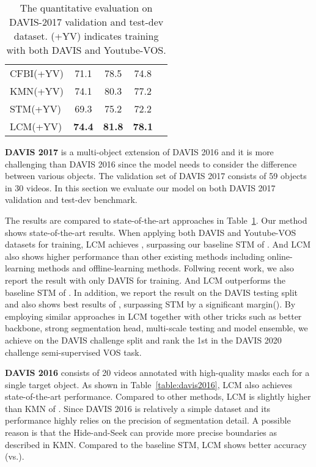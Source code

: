 \documentclass[final]{cvpr}
\begin{document}
\begin{table}
\begin{center}
\begin{tabular}{lcccc}
CFBI\cite{cfbi}(+YV)  & 71.1 &  78.5 &  74.8 \\
KMN\cite{KMN}(+YV)     &  74.1 & 80.3 & 77.2 \\


\hline
STM\cite{STM}(+YV)  &  69.3  &  75.2 & 72.2  \\
LCM(+YV)      & \textbf{74.4} &  \textbf{81.8} &  \textbf{78.1} \\
\hline
\end{tabular}
\end{center} 	\caption{The quantitative evaluation on DAVIS-2017 validation and test-dev dataset. (+YV) indicates training with both DAVIS and Youtube-VOS.  }
	\label{table:davis2017}
\end{table}


\textbf{DAVIS 2017}\cite{davis2017} is a multi-object extension of DAVIS 2016 and it is more challenging than DAVIS 2016 since the model needs to consider the difference between various objects. The validation set of DAVIS 2017 consists of 59 objects in 30 videos. In this section we evaluate our model on both DAVIS 2017 validation and test-dev benchmark. 

The results are compared to state-of-the-art approaches in Table~\ref{table:davis2017}. 
Our method shows state-of-the-art results. When applying both DAVIS and Youtube-VOS datasets for training, LCM achieves , surpassing our baseline STM of . And LCM also shows higher performance than other existing methods including online-learning methods and offline-learning methods. Follwing recent work, we also report the result with only DAVIS for training. And LCM outperforms the baseline STM of .
In addition, we report the result on the DAVIS testing split and also shows best results of , surpassing STM by a significant margin(). By employing similar approaches in LCM together with other tricks such as better backbone, strong segmentation head, multi-scale testing and model ensemble, we achieve  on the DAVIS challenge split and rank the 1st in the DAVIS 2020 challenge semi-supervised VOS task.




\textbf{DAVIS 2016}\cite{davis2016} consists of 20 videos annotated with high-quality masks each for a single target object. As shown in Table~\ref{table:davis2016}, LCM also achieves state-of-the-art performance. Compared to other methods, LCM is slightly higher than KMN of . Since DAVIS 2016 is relatively a simple dataset and its performance highly relies on the precision of segmentation detail. A possible reason is that the Hide-and-Seek can provide more precise boundaries as described in KMN. Compared to the baseline STM, LCM shows better accuracy (vs.).
\end{document}
